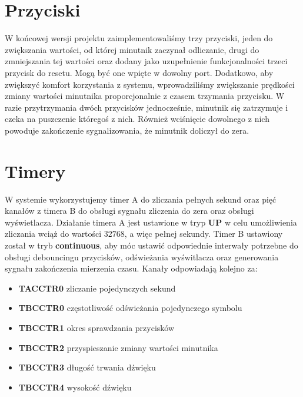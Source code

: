 \documentclass[fleqn]{article}
\begin{document}
\section{Przyciski}

W końcowej wersji projektu zaimplementowaliśmy trzy przyciski, jeden do zwiększania wartości, od której minutnik zaczynał odliczanie, drugi do zmniejszania tej wartości oraz dodany jako uzupełnienie funkcjonalności trzeci przycisk do resetu. Mogą być one wpięte w dowolny port. Dodatkowo, aby zwiększyć komfort korzystania z systemu, wprowadziliśmy zwiększanie prędkości zmiany wartości minutnika proporcjonalnie z czasem trzymania przycisku. W razie przytrzymania dwóch przycisków jednocześnie, minutnik się zatrzymuje i czeka na puszczenie któregoś z nich. Również wciśnięcie dowolnego z nich powoduje zakończenie sygnalizowania, że minutnik doliczył do zera.


\section{Timery}

W systemie wykorzystujemy timer A do zliczania pełnych sekund oraz pięć kanałów z timera B do obsługi sygnału zliczenia do zera oraz obsługi wyświetlacza. Działanie timera A jest ustawione w tryp \textbf{UP} w celu umożliwienia zliczania wciąż do wartości $32768$, a więc pełnej sekundy. Timer B ustawiony został w tryb \textbf{continuous}, aby móc ustawić odpowiednie interwały potrzebne do obsługi debouncingu przycisków, odświeżania wyświtlacza oraz generowania sygnału zakończenia mierzenia czasu. Kanały odpowiadają kolejno za:
\begin{itemize}
	\item  \textbf{TACCTR0} zliczanie pojedynczych sekund
	\item  \textbf{TBCCTR0} częstotliwość odświeżania pojedynczego symbolu
	\item  \textbf{TBCCTR1} okres sprawdzania przycisków
	\item  \textbf{TBCCTR2} przyspieszanie zmiany wartości minutnika
	\item  \textbf{TBCCTR3} długość trwania dźwięku
	\item  \textbf{TBCCTR4} wysokość dźwięku
\end{itemize}
\end{document}
